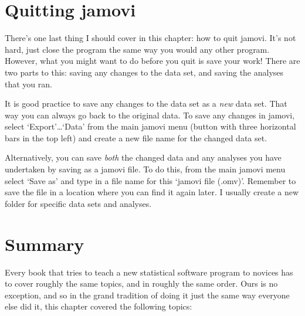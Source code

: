 \documentclass[
]{book}
\begin{document}
\hypertarget{quitting-jamovi}{%
\section{Quitting jamovi}\label{quitting-jamovi}}

There's one last thing I should cover in this chapter: how to quit jamovi. It's not hard, just close the program the same way you would any other program. However, what you might want to do before you quit is save your work! There are two parts to this: saving any changes to the data set, and saving the analyses that you ran.

It is good practice to save any changes to the data set as a \emph{new} data set. That way you can always go back to the original data. To save any changes in jamovi, select `Export'\ldots{}`Data' from the main jamovi menu (button with three horizontal bars in the top left) and create a new file name for the changed data set.

Alternatively, you can save \emph{both} the changed data and any analyses you have undertaken by saving as a jamovi file. To do this, from the main jamovi menu select `Save as' and type in a file name for this `jamovi file (.omv)'. Remember to save the file in a location where you can find it again later. I usually create a new folder for specific data sets and analyses.

\hypertarget{summary-1}{%
\section{Summary}\label{summary-1}}

Every book that tries to teach a new statistical software program to novices has to cover roughly the same topics, and in roughly the same order. Ours is no exception, and so in the grand tradition of doing it just the same way everyone else did it, this chapter covered the following topics:
\end{document}
